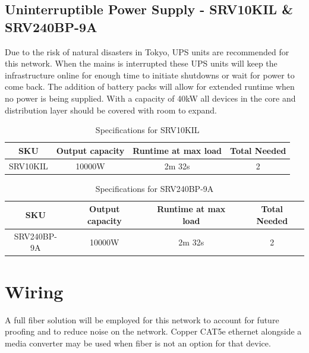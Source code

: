 \subsection{Uninterruptible Power Supply - SRV10KIL \& SRV240BP-9A}
Due to the risk of natural disasters in Tokyo, UPS units are recommended for this network. When the mains is interrupted these UPS units will keep the infrastructure online for enough time to initiate shutdowns or wait for power to come back.
The addition of battery packs will allow for extended runtime when no power is being supplied. With a capacity of 40kW all devices in the core and distribution layer should be covered with room to expand.
\begin{table}[H]
    \centering
    \begin{tabular}{|cccc|}
    \hline
    \multicolumn{1}{|c|}{SKU} & \multicolumn{1}{c|}{Output capacity} & \multicolumn{1}{c|}{Runtime at max load} & Total Needed \\ \hline
    SRV10KIL                  & 10000W                               & 2m 32s                                   & 2            \\ \hline
    \end{tabular}
    \caption{Specifications for SRV10KIL \parencite{ups-specs}}
\end{table}
\begin{table}[H]
    \centering
    \begin{tabular}{|cccc|}
    \hline
    \multicolumn{1}{|c|}{SKU} & \multicolumn{1}{c|}{Output capacity} & \multicolumn{1}{c|}{Runtime at max load} & Total Needed \\ \hline
    SRV240BP-9A               & 10000W                               & 2m 32s                                   & 2            \\ \hline
    \end{tabular}
    \caption{Specifications for SRV240BP-9A \parencite{bp-specs}}
\end{table}
\section{Wiring}
A full fiber solution will be employed for this network to account for future proofing and to reduce noise on the network. Copper CAT5e ethernet alongside a media converter may be used when fiber is not an option for that device.
